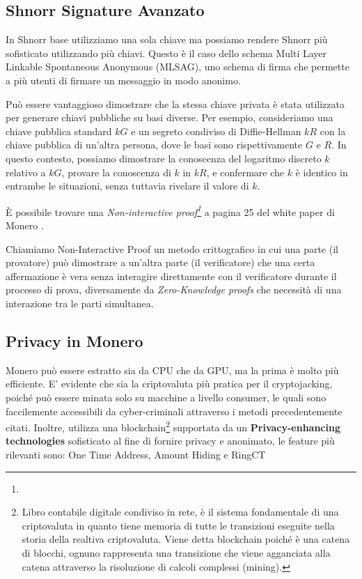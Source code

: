 \documentclass[12pt,a4paper]{article}
\begin{document}
\subsection{Shnorr Signature Avanzato}
In Shnorr base utilizziamo una sola chiave ma possiamo rendere Shnorr più
sofisticato utilizzando più chiavi. Questo è il caso dello schema Multi Layer
Linkable Spontaneous Anonymous (MLSAG), uno schema di firma che permette a più
utenti di firmare un messaggio in modo anonimo. 

Può essere vantaggioso dimostrare che la stessa chiave privata è stata
utilizzata per generare chiavi pubbliche su basi diverse. Per esempio,
consideriamo una chiave pubblica standard $kG$ e un segreto condiviso di
Diffie-Hellman $kR$ con la chiave pubblica di un'altra persona, dove le basi
sono rispettivamente $G$ e $R$. In questo contesto, possiamo dimostrare la
conoscenza del logaritmo discreto $k$ relativo a $kG$, provare la conoscenza di
$k$ in $kR$, e confermare che $k$ è identico in entrambe le situazioni, senza
tuttavia rivelare il valore di $k$.

È possibile trovare una \textit{Non-interactive proof\footnote{}} a pagina 25
del white paper di Monero \cite{Zero To Monero}.

Chiamiamo Non-Interactive Proof un metodo crittografico in cui una parte (il
provatore) può dimostrare a un'altra parte (il verificatore) che una certa
affermazione è vera senza interagire direttamente con il verificatore durante il
processo di prova, diversamente da \textit{Zero-Knowledge proofs} che necessità
di una interazione tra le parti simultanea.

\subsection{Privacy in Monero}
Monero può essere estratto sia da CPU che da GPU, ma la prima è molto più
efficiente. E' evidente che sia la criptovaluta più pratica per il
cryptojacking, poiché può essere minata solo su macchine a livello consumer, le
quali sono faccilemente accessibili da cyber-criminali attraverso i metodi
precedentemente citati. Inoltre, utilizza una blockchain\footnote{Libro
contabile digitale condiviso in rete, è il sistema fondamentale di una
criptovaluta in quanto tiene memoria di tutte le transizioni eseguite nella
storia della realtiva criptovaluta. Viene detta blockchain poiché è una catena
di blocchi, ognuno rappresenta una transizione che viene agganciata alla catena
attraverso la risoluzione di calcoli complessi (mining).} supportata da un
\textbf{Privacy-enhancing technologies} sofisticato al fine di fornire privacy e
anonimato, le feature più rilevanti sono: One Time Address, Amount Hiding e RingCT
\end{document}
